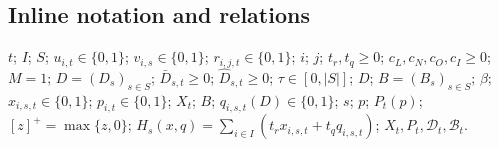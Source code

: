 \documentclass[10pt]{article}
\begin{document}
\subsection*{Inline notation and relations}
$t$; $I$; $S$; $u_{i,t}\in\{0,1\}$; $v_{i,s}\in\{0,1\}$; $r_{i,j,t}\in\{0,1\}$; $i$; $j$; $t_r,t_q\geq0$; $c_L,c_N,c_O,c_I\geq0$; $M=1$; $D=(D_s)_{s\in S}$; $\bar D_{s,t}\geq0$; $\widehat D_{s,t}\geq0$; $\tau\in[0,|S|]$; $D$; $B=(B_s)_{s\in S}$; $\beta$; $x_{i,s,t}\in\{0,1\}$; $p_{i,t}\in\{0,1\}$; $X_t$; $B$; $q_{i,s,t}(D)\in\{0,1\}$; $s$; $p$; $P_t(p)$; $[z]^+=\max\{z,0\}$; $H_s(x,q)=\sum_{i\in I}(t_rx_{i,s,t}+t_qq_{i,s,t})$; $X_t,P_t,\mathcal D_t,\mathcal B_t$.
\end{document}
